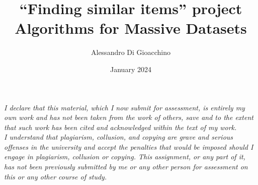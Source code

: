 \documentclass{article}
\title{“Finding similar items” project \\ \small Algorithms for Massive Datasets}
\author{Alessandro Di Gioacchino}
\date{January 2024}
\begin{document}
  \maketitle

  \tableofcontents


  \vspace*{\fill}
  \textit{I declare that this material, which I now submit for assessment, is
  entirely my own work and has not been taken from the work of others, save and
  to the extent that such work has been cited and acknowledged within the text
  of my work.} \\
  \textit{I understand that plagiarism, collusion, and copying are grave and
  serious offenses in the university and accept the penalties that would be
  imposed should I engage in plagiarism, collusion or copying. This assignment,
  or any part of it, has not been previously submitted by me or any other
  person for assessment on this or any other course of study.}
\end{document}
